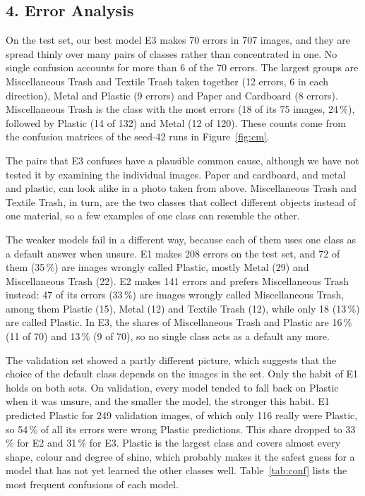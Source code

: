 \documentclass{article}
\begin{document}
\subsection{4. Error Analysis}

On the test set, our best model E3 makes 70 errors in 707 images, and they are spread thinly over many pairs of classes rather than concentrated in one. No single confusion accounts for more than 6 of the 70 errors. The largest groups are Miscellaneous Trash and Textile Trash taken together (12 errors, 6 in each direction), Metal and Plastic (9 errors) and Paper and Cardboard (8 errors). Miscellaneous Trash is the class with the most errors (18 of its 75 images, 24\,\%), followed by Plastic (14 of 132) and Metal (12 of 120). These counts come from the confusion matrices of the seed-42 runs in Figure~\ref{fig:cm}.

The pairs that E3 confuses have a plausible common cause, although we have not tested it by examining the individual images. Paper and cardboard, and metal and plastic, can look alike in a photo taken from above. Miscellaneous Trash and Textile Trash, in turn, are the two classes that collect different objects instead of one material, so a few examples of one class can resemble the other.

The weaker models fail in a different way, because each of them uses one class as a default answer when unsure. E1 makes 208 errors on the test set, and 72 of them (35\,\%) are images wrongly called Plastic, mostly Metal (29) and Miscellaneous Trash (22). E2 makes 141 errors and prefers Miscellaneous Trash instead: 47 of its errors (33\,\%) are images wrongly called Miscellaneous Trash, among them Plastic (15), Metal (12) and Textile Trash (12), while only 18 (13\,\%) are called Plastic. In E3, the shares of Miscellaneous Trash and Plastic are 16\,\% (11 of 70) and 13\,\% (9 of 70), so no single class acts as a default any more.

The validation set showed a partly different picture, which suggests that the choice of the default class depends on the images in the set. Only the habit of E1 holds on both sets. On validation, every model tended to fall back on Plastic when it was unsure, and the smaller the model, the stronger this habit. E1 predicted Plastic for 249 validation images, of which only 116 really were Plastic, so 54\,\% of all its errors were wrong Plastic predictions. This share dropped to 33\,\% for E2 and 31\,\% for E3. Plastic is the largest class and covers almost every shape, colour and degree of shine, which probably makes it the safest guess for a model that has not yet learned the other classes well. Table~\ref{tab:conf} lists the most frequent confusions of each model.
\end{document}

